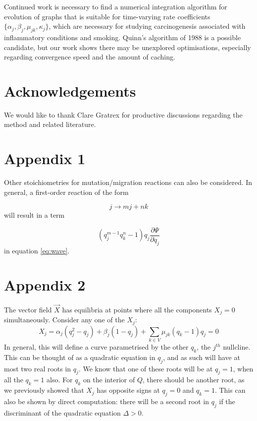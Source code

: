 \documentclass{article}
\begin{document}
Continued work is necessary to find a numerical integration algorithm for
evolution of graphs that is suitable for time-varying rate coefficients $\{\alpha_j,
\beta_j, \mu_{jk}, \kappa_j\}$, which are necessary for studying carcinogenesis
associated with inflammatory conditions and smoking. Quinn's algorithm of 1988
is a possible candidate, but our work shows there may be unexplored
optimisations, especially regarding convergence speed and the amount of
caching.

\section{Acknowledgements}

We would like to thank Clare Gratrex for productive discussions regarding the
method and related literature. %





\section{Appendix 1}

Other stoichiometries for mutation/migration reactions can also be considered.
In general, a first-order reaction of the form

\begin{equation}
    j \rightarrow m j + n k
\end{equation}
will result in a term

\begin{equation}
    (q_j^{m-1} q_k^n - 1) q_j \frac{\partial \Psi}{\partial q_j}
\end{equation}
in equation \eqref{eq:wave}.

\section{Appendix 2}

The vector field $\vec{X}$ has equilibria at points where all the components
$X_j = 0$ simultaneously. Consider any one of the $X_j$:
\begin{equation}
    X_j = \alpha_j (q_j^2 - q_j) + \beta_j (1 - q_j) 
          + \sum_{k \in V} \mu_{jk} (q_k - 1) q_j = 0
\end{equation}
In general, this will define a curve parametrised by the other $q_k$, the
$j^{th}$ nullcline.
This can be thought of as a quadratic equation in $q_j$, and as such will have
at most two real roots in $q_j$. We know that one of these roots will be at $q_j
= 1$, when all the $q_k = 1$ also. For $q_k$ on the interior of $Q$, there
should be another root, as we previously showed that $X_j$ has opposite signs at
$q_j = 0$ and $q_k = 1$. This can also be shown by direct computation: there
will be a second root in $q_j$ if the discriminant of the quadratic equation $\Delta > 0$.
\end{document}

